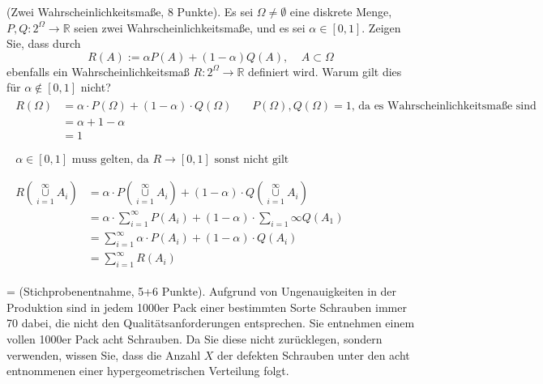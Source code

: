 \documentclass[twoside]{article}
\begin{document}
(Zwei Wahrscheinlichkeitsmaße, 8 Punkte).
Es sei $\Omega \neq \emptyset$ eine diskrete Menge, $P,Q: 2^{\Omega} \rightarrow \mathbb{R}$ seien zwei Wahrscheinlichkeitsmaße, und es sei $\alpha \in [0,1]$.
Zeigen Sie, dass durch
\[
	R(A) := \alpha P(A) + (1-\alpha)Q(A),~~~~~A \subset \Omega
\]
ebenfalls ein Wahrscheinlichkeitsmaß $R:2^{\Omega} \rightarrow \mathbb{R}$ definiert wird.
Warum gilt dies für $\alpha \not \in [0,1]$ nicht?
\[
	\begin{array}{c}
		\begin{array}{ll}
			R(\Omega)	&=\alpha \cdot P(\Omega)+(1-\alpha)\cdot Q(\Omega)~~~~~~~~P(\Omega),Q(\Omega) = 1\text{, da es Wahrscheinlichkeitsmaße sind}\\
						&=\alpha+1-\alpha\\
						&=1
		\end{array}\\\\
		\begin{array}{c}
			\alpha \in [0,1]\text{ muss gelten, da } R \rightarrow [0,1] \text{ sonst nicht gilt}
		\end{array}\\\\
		\begin{array}{ll}
			R(\overset{\infty}{\underset{i=1}{\cup}}A_i)	&=	\alpha \cdot P(\overset{\infty}{\underset{i=1}{\cup}} A_i)+ (1-\alpha) \cdot Q(\overset{\infty}{\underset{i=1}{\cup}} A_i)\\
															&=	\alpha \cdot \sum_{i=1}^{\infty}P(A_i) + (1-\alpha) \cdot \sum_{i=1}{\infty}Q(A_1)\\
															&=	\sum_{i=1}^{\infty} \alpha \cdot P(A_i) + (1-\alpha) \cdot Q(A_i)\\
															&=	\sum_{i=1}^{\infty} R(A_i)
		\end{array}
	\end{array}
\]

\fi



\ifnum\ZettelFuenf=\True
{}
	(Stichprobenentnahme, 5+6 Punkte).
	Aufgrund von Ungenauigkeiten in der Produktion sind in jedem 1000er Pack einer bestimmten Sorte Schrauben immer 70 dabei, die nicht den Qualitätsanforderungen entsprechen.
	Sie entnehmen einem vollen 1000er Pack acht Schrauben.
	Da Sie diese nicht zurücklegen, sondern verwenden, wissen Sie, dass die Anzahl $X$ der defekten Schrauben unter den acht entnommenen einer hypergeometrischen Verteilung folgt.
	
\end{document}
